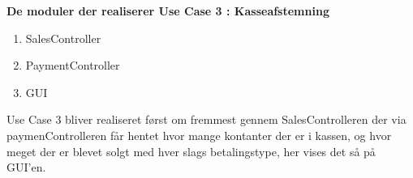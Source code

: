 \textbf{De moduler der realiserer Use Case 3 : Kasseafstemning}

\begin{enumerate}
	\item SalesController
	\item PaymentController
	\item GUI
\end{enumerate}

Use Case 3 bliver realiseret først om fremmest gennem SalesControlleren der via paymenControlleren får hentet hvor mange kontanter der er i kassen, og hvor meget der er blevet solgt med hver slags betalingstype, her vises det så på GUI'en. 
